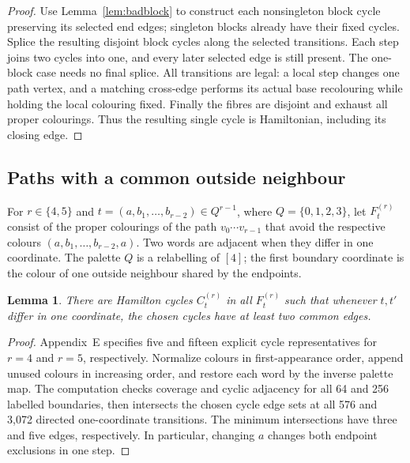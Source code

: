 \documentclass[11pt]{article}
\newtheorem{lemma}[theorem]{Lemma}
\theoremstyle{remark}
\numberwithin{equation}{section}
\numberwithin{table}{section}
\begin{document}
\begin{proof}
Use Lemma~\ref{lem:badblock} to construct each nonsingleton block
cycle preserving its selected end edges; singleton blocks already
have their fixed cycles. Splice the resulting disjoint block cycles
along the selected transitions. Each step joins two cycles into one,
and every later selected edge is still present. The one-block case
needs no final splice. All transitions are legal: a local step changes
one path vertex, and a matching cross-edge performs its actual base
recolouring while holding the local colouring fixed. Finally the fibres
are disjoint and exhaust all proper colourings. Thus the resulting
single cycle is Hamiltonian, including its closing edge.
\end{proof}


\subsection{Paths with a common outside neighbour}

For $r\in\{4,5\}$ and $t=(a,b_1,\ldots,b_{r-2})\in Q^{r-1}$, where
$Q=\{0,1,2,3\}$, let $F_t^{(r)}$ consist of the proper colourings of
the path $v_0\cdots v_{r-1}$ that avoid the respective colours
$(a,b_1,\ldots,b_{r-2},a)$. Two words are adjacent when they differ in
one coordinate. The palette $Q$ is a relabelling of $[4]$; the first
boundary coordinate is the colour of one outside neighbour shared by
the endpoints.

\begin{lemma}\label{lem:shared-hub-path-data}
There are Hamilton cycles $C_t^{(r)}$ in all $F_t^{(r)}$ such that
whenever $t,t'$ differ in one coordinate, the chosen cycles have at
least two common edges.
\end{lemma}
\begin{proof}
Appendix~E specifies five and fifteen explicit cycle representatives
for $r=4$ and $r=5$, respectively. Normalize colours in first-appearance
order, append unused colours in increasing order, and restore each word
by the inverse palette map. The computation checks coverage and cyclic
adjacency for all 64 and 256 labelled boundaries, then intersects the chosen
cycle edge sets at all 576 and 3,072 directed one-coordinate transitions.
The minimum intersections have three and five edges, respectively.
In particular, changing $a$ changes both endpoint exclusions in one step.
\end{proof}
\end{document}
